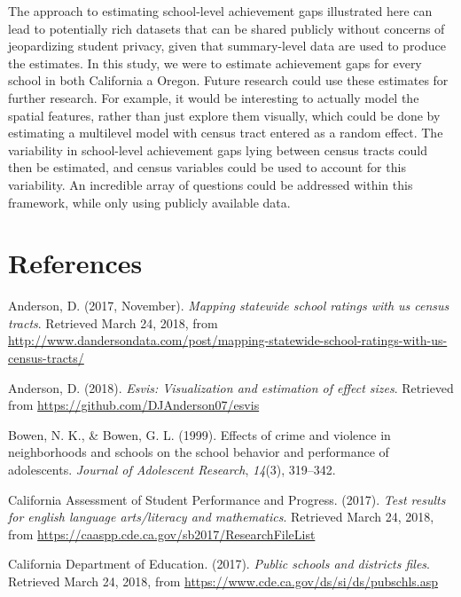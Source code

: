 \documentclass[man, fleqn, noextraspace]{apa6}
\theoremstyle{definition}
\theoremstyle{definition}
\theoremstyle{definition}
\theoremstyle{remark}
\begin{document}
The approach to estimating school-level achievement gaps illustrated
here can lead to potentially rich datasets that can be shared publicly
without concerns of jeopardizing student privacy, given that
summary-level data are used to produce the estimates. In this study, we
were to estimate achievement gaps for every school in both California a
Oregon. Future research could use these estimates for further research.
For example, it would be interesting to actually model the spatial
features, rather than just explore them visually, which could be done by
estimating a multilevel model with census tract entered as a random
effect. The variability in school-level achievement gaps lying between
census tracts could then be estimated, and census variables could be
used to account for this variability. An incredible array of questions
could be addressed within this framework, while only using publicly
available data.

\newpage

\hypertarget{references}{%
\section{References}\label{references}}

\begingroup\setlength{\parindent}{-0.5in}\setlength{\leftskip}{0.25in}

\hypertarget{refs}{}
\leavevmode\hypertarget{ref-anderson17a}{}%
Anderson, D. (2017, November). \emph{Mapping statewide school ratings
with us census tracts}. Retrieved March 24, 2018, from
\url{http://www.dandersondata.com/post/mapping-statewide-school-ratings-with-us-census-tracts/}

\leavevmode\hypertarget{ref-esvis}{}%
Anderson, D. (2018). \emph{Esvis: Visualization and estimation of effect
sizes}. Retrieved from \url{https://github.com/DJAnderson07/esvis}

\leavevmode\hypertarget{ref-bowen99}{}%
Bowen, N. K., \& Bowen, G. L. (1999). Effects of crime and violence in
neighborhoods and schools on the school behavior and performance of
adolescents. \emph{Journal of Adolescent Research}, \emph{14}(3),
319--342.

\leavevmode\hypertarget{ref-ca17a}{}%
California Assessment of Student Performance and Progress. (2017).
\emph{Test results for english language arts/literacy and mathematics}.
Retrieved March 24, 2018, from
\url{https://caaspp.cde.ca.gov/sb2017/ResearchFileList}

\leavevmode\hypertarget{ref-ca17b}{}%
California Department of Education. (2017). \emph{Public schools and
districts files}. Retrieved March 24, 2018, from
\url{https://www.cde.ca.gov/ds/si/ds/pubschls.asp}
\end{document}
